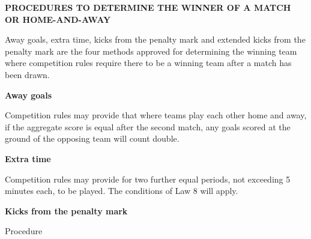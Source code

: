 \clearpage
\sffamily
{\bfseries\color[rgb]{0.4,0.4,0.4}
PROCEDURES TO DETERMINE THE WINNER OF A MATCH OR HOME-AND-AWAY }
{}

\bigskip

Away goals, extra time, kicks from the penalty mark and extended kicks from the penalty mark are the four methods approved for determining the winning team where competition rules require there to be a winning team after a match has been drawn.

\bigskip

{\bfseries Away goals}

Competition rules may provide that where teams play each other home and away, if the aggregate score is equal after the second match, any goals scored at the ground of the opposing team will count double.

\bigskip

{\bfseries Extra time}

Competition rules may provide for two further equal periods, not exceeding 5 minutes each, to be played. The conditions of Law 8 will apply. 

\bigskip

{\bfseries Kicks from the penalty mark }

Procedure

\headlinebox
 
